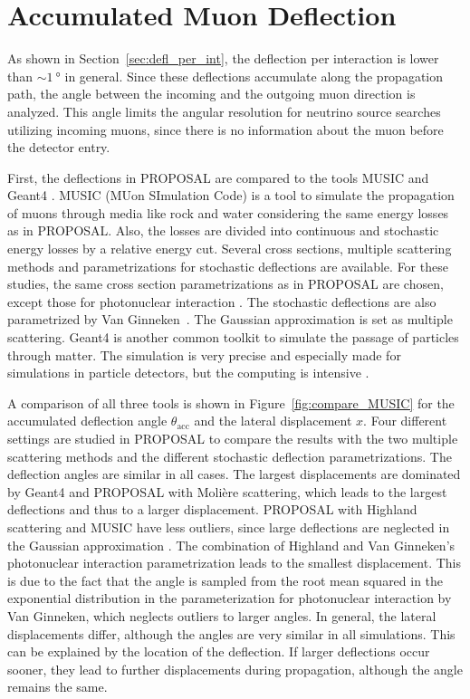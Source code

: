 \section{Accumulated Muon Deflection}\label{sec:accum_defl}

As shown in Section~\ref{sec:defl_per_int}, the deflection per interaction 
is lower than $\sim\SI{1}{\degree}$ in general. Since these deflections accumulate along the 
propagation path, the angle between the incoming and the outgoing 
muon direction is analyzed. This angle limits the angular resolution 
for neutrino source searches utilizing incoming muons, since there is no information 
about the muon before the detector entry.

First, the deflections in PROPOSAL are compared to 
the tools MUSIC \cite{MUSIC,comparison_MUSIC_GEANT4_2009} and Geant4 \cite{GEANT4}.
MUSIC (MUon SImulation Code) is a tool to simulate the propagation of muons 
through media like rock and water considering the same energy losses as in 
PROPOSAL. Also, the losses are divided into continuous and stochastic 
energy losses by a relative energy cut. Several cross sections, multiple scattering 
methods and parametrizations for stochastic deflections are 
available. For these studies, the same cross section parametrizations 
as in PROPOSAL are chosen, except those for 
photonuclear interaction \cite{nulcint_bugaev_Shlepin, bugaev_1980_defl,bugaev_1981_defl}. The stochastic deflections are also parametrized by 
Van Ginneken~\cite{Van_Ginneken}. 
The Gaussian 
approximation \cite{HIGHLAND_1975} is set as multiple scattering. 
Geant4 is another common toolkit to simulate the passage of particles through 
matter. The simulation is very precise and especially 
made for simulations in particle detectors, but the computing is 
intensive \cite{GEANT4}. 

A comparison of all three tools is shown in Figure~\ref{fig:compare_MUSIC} 
for the 
accumulated deflection angle $\theta_{\text{acc}}$ and the lateral displacement
$x$. Four different settings are studied in PROPOSAL to compare the results with 
the two multiple scattering methods and the different stochastic deflection parametrizations.
The deflection angles are 
similar in all cases. The 
largest displacements are dominated by Geant4 and PROPOSAL with Molière scattering, which 
leads to the largest deflections and thus to a larger displacement. 
PROPOSAL with Highland scattering and MUSIC have less outliers, since large 
deflections are neglected in the Gaussian approximation \cite{HIGHLAND_1975}. 
The combination of Highland and 
Van Ginneken's photonuclear interaction parametrization leads to the smallest 
displacement. This is due to the fact that the angle is sampled from the root mean squared in the exponential distribution
in the parameterization for photonuclear interaction by Van Ginneken, which neglects 
outliers to larger angles. 
In general, the lateral displacements differ, although the angles are very similar in all simulations. 
This can be explained by the location of the deflection. If larger deflections occur sooner, 
they lead to further displacements during propagation, although the angle remains the same.

